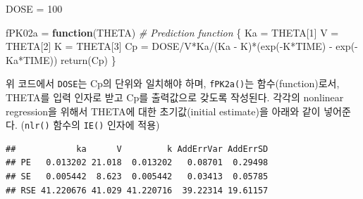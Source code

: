 \documentclass[
  11pt,
  krantz2, a4paper, twoside]{krantz}
\newenvironment{Shaded}{\begin{snugshade}}{\end{snugshade}}
\newcommand{\AttributeTok}[1]{\textcolor[rgb]{0.77,0.63,0.00}{#1}}
\newcommand{\CommentTok}[1]{\textcolor[rgb]{0.56,0.35,0.01}{\textit{#1}}}
\newcommand{\ControlFlowTok}[1]{\textcolor[rgb]{0.13,0.29,0.53}{\textbf{#1}}}
\newcommand{\DecValTok}[1]{\textcolor[rgb]{0.00,0.00,0.81}{#1}}
\newcommand{\FloatTok}[1]{\textcolor[rgb]{0.00,0.00,0.81}{#1}}
\newcommand{\FunctionTok}[1]{\textcolor[rgb]{0.00,0.00,0.00}{#1}}
\newcommand{\NormalTok}[1]{#1}
\newcommand{\OtherTok}[1]{\textcolor[rgb]{0.56,0.35,0.01}{#1}}
\newcommand{\SpecialCharTok}[1]{\textcolor[rgb]{0.00,0.00,0.00}{#1}}
\newcommand{\StringTok}[1]{\textcolor[rgb]{0.31,0.60,0.02}{#1}}
\theoremstyle{definition}
\theoremstyle{definition}
\theoremstyle{definition}
\theoremstyle{definition}
\theoremstyle{remark}
\begin{document}
\begin{Shaded}
\begin{Highlighting}[]
\NormalTok{DOSE }\OtherTok{=} \DecValTok{100}

\NormalTok{fPK02a }\OtherTok{=} \ControlFlowTok{function}\NormalTok{(THETA) }\CommentTok{\# Prediction function}
\NormalTok{\{}
\NormalTok{  Ka }\OtherTok{=}\NormalTok{ THETA[}\DecValTok{1}\NormalTok{]}
\NormalTok{  V  }\OtherTok{=}\NormalTok{ THETA[}\DecValTok{2}\NormalTok{]}
\NormalTok{  K  }\OtherTok{=}\NormalTok{ THETA[}\DecValTok{3}\NormalTok{]}
\NormalTok{  Cp }\OtherTok{=}\NormalTok{ DOSE}\SpecialCharTok{/}\NormalTok{V}\SpecialCharTok{*}\NormalTok{Ka}\SpecialCharTok{/}\NormalTok{(Ka }\SpecialCharTok{{-}}\NormalTok{ K)}\SpecialCharTok{*}\NormalTok{(}\FunctionTok{exp}\NormalTok{(}\SpecialCharTok{{-}}\NormalTok{K}\SpecialCharTok{*}\NormalTok{TIME) }\SpecialCharTok{{-}} \FunctionTok{exp}\NormalTok{(}\SpecialCharTok{{-}}\NormalTok{Ka}\SpecialCharTok{*}\NormalTok{TIME))}
  \FunctionTok{return}\NormalTok{(Cp)}
\NormalTok{\}}
\end{Highlighting}
\end{Shaded}

위 코드에서 \texttt{DOSE}는 Cp의 단위와 일치해야 하며, \texttt{fPK2a()}는 함수(function)로서, THETA를 입력 인자로 받고 Cp를 출력값으로 갖도록 작성된다.
각각의 nonlinear regression을 위해서 THETA에 대한 초기값(initial estimate)을 아래와 같이 넣어준다. (\texttt{nlr()} 함수의 \texttt{IE()} 인자에 적용)

\begin{Shaded}
\end{Shaded}

\begin{verbatim}
##            ka      V         k AddErrVar AddErrSD
## PE   0.013202 21.018  0.013202   0.08701  0.29498
## SE   0.005442  8.623  0.005442   0.03413  0.05785
## RSE 41.220676 41.029 41.220716  39.22314 19.61157
\end{verbatim}
\end{document}
